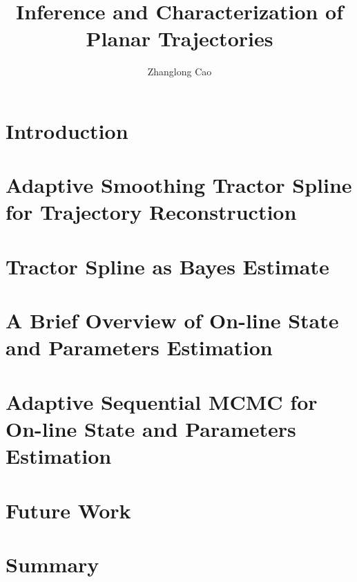 \documentclass[12pt,twoside]{report}
\title{Inference and Characterization of Planar Trajectories}
\author{Zhanglong Cao}
\date{}
\begin{document}
\frontstuff

\linespread{1.3} \normalsize


\chapter{Introduction}\label{ChapterIntro}

\clearemptydoublepage

\chapter{Adaptive Smoothing Tractor Spline for Trajectory Reconstruction}\label{ChapterTS}

\clearemptydoublepage

\chapter{Tractor Spline as Bayes Estimate}\label{ChapterGPR}

\clearemptydoublepage

\chapter{A Brief Overview of On-line State and Parameters Estimation}\label{ChapterFR}

\clearemptydoublepage

\chapter{Adaptive Sequential MCMC for On-line State and Parameters Estimation}\label{ChapterMCMC}

\clearemptydoublepage

%


\chapter{Future Work}\label{ChapterFuture}

\clearemptydoublepage


\chapter{Summary}\label{ChapterSummary}

\clearemptydoublepage
\end{document}

